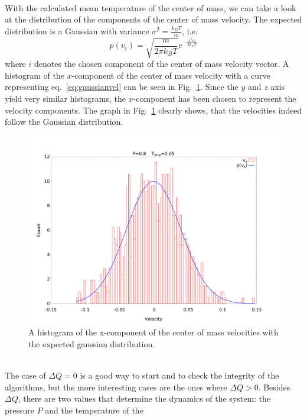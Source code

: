\documentclass[12pt]{article}
\begin{document}
\\With the calculated mean temperature of the center of mass, we can take a look at the distribution of the components of the center of mass velocity.
The expected distribution is a Gaussian with variance $\sigma^2=\frac{k_B T}{m}$, i.e.
\begin{equation}
    \label{eq:gaussianvel}
    p(v_i) = \sqrt{\frac{m}{2\pi k_B T}} e^{-\frac{x^2 m}{2 k_B T}}
\end{equation}
where $i$ denotes the chosen component of the center of mass velocity vector. A histogram of the $x$-component of the center of mass velocity  
with a curve representing eq.~\eqref{eq:gaussianvel} can be seen in Fig.~\ref{fig:comvel}. Since the $y$ and $z$ axis yield very similar histograms, the
$x$-component has been chosen to represent the velocity components. The graph in Fig.~\ref{fig:comvel} clearly shows, that the velocities indeed follow
the Gaussian distribution.
\begin{figure}[h]
    \begin{center}
        \includegraphics[scale=0.4]{images/vcomtemp.pdf}
        \caption{A histogram of the x-component of the center of mass velocities with the expected gaussian distribution.}
        \label{fig:comvel}
    \end{center}
\end{figure}
\\The case of $\Delta Q=0$ is a good way to start and to check the integrity of the algorithms, but the more interesting cases are the ones where
$\Delta Q > 0$. Besides $\Delta Q$, there are two values that determine the dynamics of the system: the pressure $P$ and the temperature of the
\end{document}
